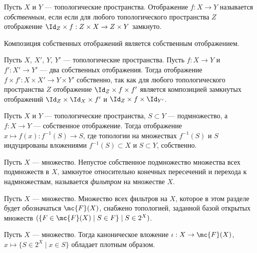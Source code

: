\documentclass[
	extrafontsizes,
	11pt,
	hyphens,
]{memoir}
\begin{document}
\begin{definition}
Пусть \(X\) и \(Y\) --- топологические пространства.
Отображение \(f : X \to Y\) называется \emph{собственным}, если если для любого топологического пространства \(Z\) отображение \(\Id_{Z} \times f : Z \times X \to Z \times Y\) замкнуто.
\end{definition}

\begin{observation}
Композиция собственных отображений является собственным отображением.
\end{observation}

\begin{observation}
Пусть \(X\), \(X'\), \(Y\), \(Y'\) --- топологические пространства.
Пусть \(f : X \to Y\) и \(f' : X' \to Y'\) --- два собственных отображения. Тогда отображение \(f \times f' : X \times X' \to Y \times Y'\) собственно, так как для любого топологического пространства \(Z\) отображение \(\Id_Z \times f \times f'\) является композицией замкнутых отображений \(\Id_Z \times \Id_X \times f'\) и \(\Id_Z \times f \times \Id_{Y'}\).
\end{observation}

\begin{observation}
Пусть \(X\) и \(Y\) --- топологические пространства, \(S \subset Y\) --- подмножество,
а \(f : X \to Y\) --- собственное отображение.
Тогда отображение \(x \mapsto f(x) : f^{-1}(S) \to S\),
где топологии на множествах \(f^{-1}(S)\) и \(S\) индуцированы вложениями \(f^{-1}(S) \subset X\) и \(S \subset Y\),
собственно.
\end{observation}

\begin{definition}
Пусть \(X\) --- множество.
Непустое собственное подмножество множества всех подмножеств в \(X\), замкнутое относительно конечных пересечений и перехода к надмножествам, называется \emph{фильтром} на множестве \(X\).
\end{definition}

\begin{definition}
Пусть \(X\) --- множество.
Множество всех фильтров на \(X\), которое в этом разделе будет обозначаться \(\mc{F}(X)\), снабжено топологией, заданной базой открытых множеств \((\{F \in \mc{F}(X) \mid S \in F\} \mid S \in 2^X)\).
\end{definition}

\begin{observation}
Пусть \(X\) --- множество.
Тогда каноническое вложение \(\iota : X \to \mc{F}(X)\), \(x \mapsto \{S \in 2^X \mid x \in S\}\) обладает плотным образом.
\end{observation}
\end{document}
